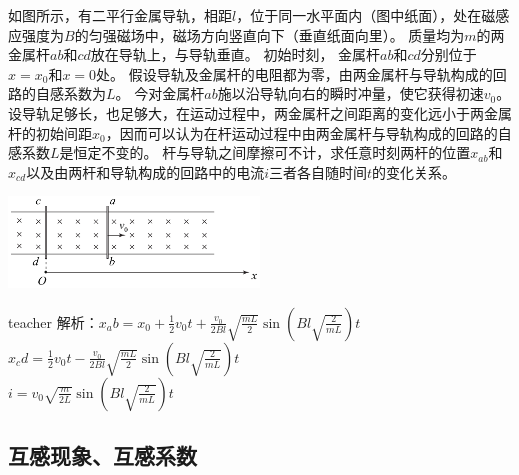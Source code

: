 \begin{example}
如图所示，有二平行金属导轨，相距$l$，位于同一水平面内（图中纸面），处在磁感应强度为$B$的匀强磁场中，磁场方向竖直向下（垂直纸面向里）。
质量均为$m$的两金属杆$ab$和$cd$放在导轨上，与导轨垂直。
初始时刻， 金属杆$ab$和$cd$分别位于$x = x_0$和$x =0$处。
假设导轨及金属杆的电阻都为零，由两金属杆与导轨构成的回路的自感系数为$L$。
今对金属杆$ab$施以沿导轨向右的瞬时冲量，使它获得初速$v_0$。
设导轨足够长，也足够大，在运动过程中，两金属杆之间距离的变化远小于两金属杆的初始间距$x_0$，因而可以认为在杆运动过程中由两金属杆与导轨构成的回路的自感系数$L$是恒定不变的。
杆与导轨之间摩擦可不计，求任意时刻两杆的位置$x_{ab}$和$x_{cd}$以及由两杆和导轨构成的回路中的电流$i$三者各自随时间$t$的变化关系。
\begin{flushright}
\includegraphics[width = 0.5\textwidth]{images/mag-22.pdf} 
\end{flushright}
\begin{taggedblock}{teacher}
\noindent
解析：$x_ab=x_0+\frac{1}{2}v_0t+\frac{v_0}{2Bl}\sqrt{\frac{mL}{2}}\sin(Bl\sqrt{\frac{2}{mL}})t$
\\$x_cd=\frac{1}{2}v_0t-\frac{v_0}{2Bl}\sqrt{\frac{mL}{2}}\sin(Bl\sqrt{\frac{2}{mL}})t$
\\$i=v_0\sqrt{\frac{m}{2L}}\sin(Bl\sqrt{\frac{2}{mL}})t$
\end{taggedblock}
\end{example}




 \subsection{互感现象、互感系数}

